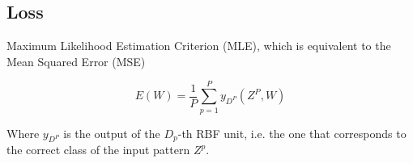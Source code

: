\documentclass[11pt]{article}
\begin{document}
\subsection{Loss}

Maximum Likelihood Estimation Criterion (MLE), which is equivalent to the Mean Squared Error (MSE)

\begin{equation*}
    E(W) = \frac 1 P \sum ^ P _{ p = 1} y_{D^P} (Z^P, W)
\end{equation*}

Where $y_{D^P}$ is the output of the $D_p$-th RBF unit, i.e. the one that corresponds to the correct class of the input pattern $Z^p$. 


\end{document}
